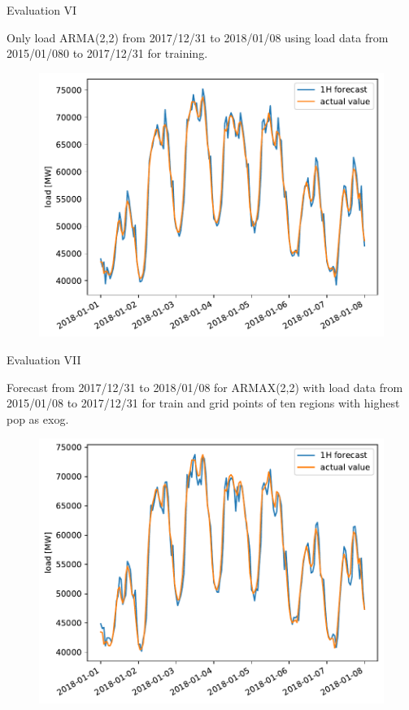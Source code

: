 \documentclass[t,xcolor={table},fleqn]{beamer}
\begin{document}
\begin{frame}{Evaluation VI}

Only load ARMA(2,2) from 2017/12/31 to 2018/01/08 using load data from 2015/01/080 to 2017/12/31 for training.

\begin{figure}[h!]%
\centering
\includegraphics[height=.8\textheight]{../doc/plots/ARMAXfc/ARMAX_p2q2_data2015to2017_fcto2018123100_plot_range2018010100_2018010800}%
\end{figure}

\end{frame}

\begin{frame}{Evaluation VII}

Forecast from 2017/12/31 to 2018/01/08 for ARMAX(2,2) with load data from 2015/01/08 to 2017/12/31 for train and grid points of ten regions with highest pop as exog.

\begin{figure}[h!]%
\centering
\includegraphics[height=.8\textheight]{../doc/plots/ARMAXfc/ARMAX_p2q2_data2015to2017_fcto2018123100_t2m_top10_plot_range2018010100_2018010800}%
\end{figure}

\end{frame}
\end{document}
